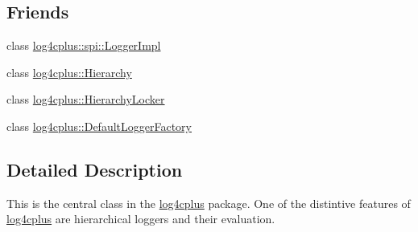 \subsection*{Friends}
\begin{DoxyCompactItemize}
\item 
class \hyperlink{classlog4cplus_1_1Logger_a8448132462ee76feacd2f66a641d3698}{log4cplus\-::spi\-::\-Logger\-Impl}
\item 
class \hyperlink{classlog4cplus_1_1Logger_a712678324a3eef2299ee1bed9c1de9ca}{log4cplus\-::\-Hierarchy}
\item 
class \hyperlink{classlog4cplus_1_1Logger_abb1f3e29e548cb77cdea6e6499167e15}{log4cplus\-::\-Hierarchy\-Locker}
\item 
class \hyperlink{classlog4cplus_1_1Logger_aefe6274366a0895600f35f268e33064c}{log4cplus\-::\-Default\-Logger\-Factory}
\end{DoxyCompactItemize}


\subsection{Detailed Description}
This is the central class in the \hyperlink{namespacelog4cplus}{log4cplus} package. One of the distintive features of \hyperlink{namespacelog4cplus}{log4cplus} are hierarchical loggers and their evaluation. 

